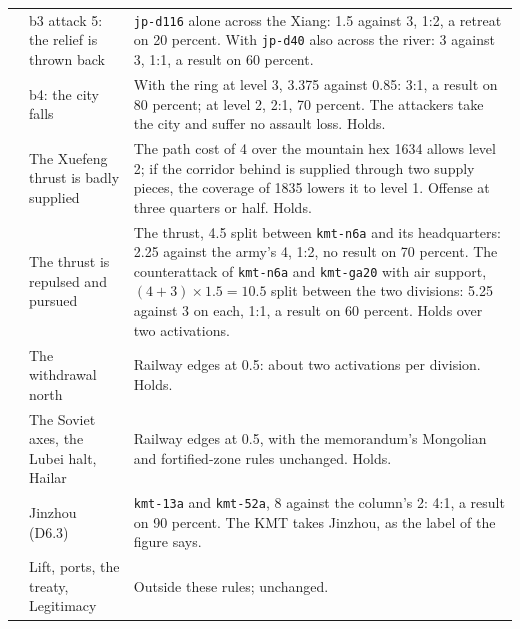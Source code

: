 \documentclass[11pt]{article}
\begin{document}
{\begin{longtable}{@{}>{\raggedright\arraybackslash}p{}>{\raggedright\arraybackslash}p{}>{\raggedright\arraybackslash}p{}@{}}
3 & b3 attack 5: the relief is thrown back & \texttt{jp-d116} alone across the Xiang: 1.5 against 3, 1:2, a retreat on 20 percent. With \texttt{jp-d40} also across the river: 3 against 3, 1:1, a result on 60 percent. \\
3 & b4: the city falls & With the ring at level 3, 3.375 against 0.85: 3:1, a result on 80 percent; at level 2, 2:1, 70 percent. The attackers take the city and suffer no assault loss. Holds. \\
4 & The Xuefeng thrust is badly supplied & The path cost of 4 over the mountain hex 1634 allows level 2; if the corridor behind is supplied through two supply pieces, the coverage of 1835 lowers it to level 1. Offense at three quarters or half. Holds. \\
4 & The thrust is repulsed and pursued & The thrust, 4.5 split between \texttt{kmt-n6a} and its headquarters: 2.25 against the army's 4, 1:2, no result on 70 percent. The counterattack of \texttt{kmt-n6a} and \texttt{kmt-ga20} with air support, $(4+3)\times 1.5=10.5$ split between the two divisions: 5.25 against 3 on each, 1:1, a result on 60 percent. Holds over two activations. \\
4 & The withdrawal north & Railway edges at 0.5: about two activations per division. Holds. \\
5 & The Soviet axes, the Lubei halt, Hailar & Railway edges at 0.5, with the memorandum's Mongolian and fortified-zone rules unchanged. Holds. \\
6 & Jinzhou (D6.3) & \texttt{kmt-13a} and \texttt{kmt-52a}, 8 against the column's 2: 4:1, a result on 90 percent. The KMT takes Jinzhou, as the label of the figure says. \\
6 & Lift, ports, the treaty, Legitimacy & Outside these rules; unchanged. \\
\end{longtable}
}
\end{document}
